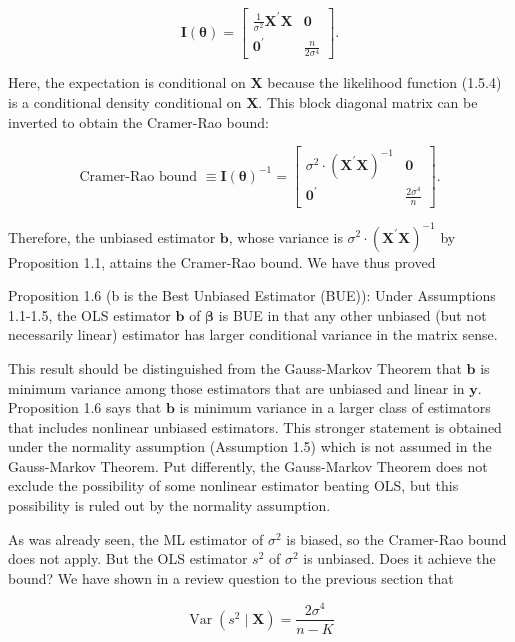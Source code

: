 \documentclass[10pt]{article}
\begin{document}
\[
\mathbf{I}(\boldsymbol{\theta})=\left[\begin{array}{cc}
\frac{1}{\sigma^{2}} \mathbf{X}^{\prime} \mathbf{X} & \mathbf{0}  \tag{1.5.15}\\
\mathbf{0}^{\prime} & \frac{n}{2 \sigma^{4}}
\end{array}\right] .
\]

Here, the expectation is conditional on $\mathbf{X}$ because the likelihood function (1.5.4) is a conditional density conditional on $\mathbf{X}$. This block diagonal matrix can be inverted to obtain the Cramer-Rao bound:

\[
\text { Cramer-Rao bound } \equiv \mathbf{I}(\boldsymbol{\theta})^{-1}=\left[\begin{array}{cc}
\sigma^{2} \cdot\left(\mathbf{X}^{\prime} \mathbf{X}\right)^{-1} & \mathbf{0}  \tag{1.5.16}\\
\mathbf{0}^{\prime} & \frac{2 \sigma^{4}}{n}
\end{array}\right] \text {. }
\]

Therefore, the unbiased estimator $\mathbf{b}$, whose variance is $\sigma^{2} \cdot\left(\mathbf{X}^{\prime} \mathbf{X}\right)^{-1}$ by Proposition 1.1, attains the Cramer-Rao bound. We have thus proved

Proposition 1.6 (b is the Best Unbiased Estimator (BUE)): Under Assumptions 1.1-1.5, the OLS estimator $\mathbf{b}$ of $\boldsymbol{\beta}$ is BUE in that any other unbiased (but not necessarily linear) estimator has larger conditional variance in the matrix sense.

This result should be distinguished from the Gauss-Markov Theorem that $\mathbf{b}$ is minimum variance among those estimators that are unbiased and linear in $\mathbf{y}$. Proposition 1.6 says that $\mathbf{b}$ is minimum variance in a larger class of estimators that includes nonlinear unbiased estimators. This stronger statement is obtained under the normality assumption (Assumption 1.5) which is not assumed in the Gauss-Markov Theorem. Put differently, the Gauss-Markov Theorem does not exclude the possibility of some nonlinear estimator beating OLS, but this possibility is ruled out by the normality assumption.

As was already seen, the ML estimator of $\sigma^{2}$ is biased, so the Cramer-Rao bound does not apply. But the OLS estimator $s^{2}$ of $\sigma^{2}$ is unbiased. Does it achieve the bound? We have shown in a review question to the previous section that

$$
\operatorname{Var}\left(s^{2} \mid \mathbf{X}\right)=\frac{2 \sigma^{4}}{n-K}
$$
\end{document}
